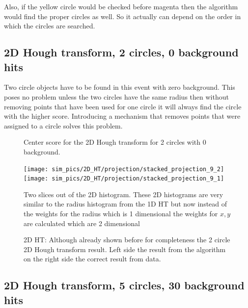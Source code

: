 \documentclass[11pt,twoside]{scrreprt}
\begin{document}
Also, if the yellow circle would be checked before magenta then the algorithm
would find the proper circles as well. So it actually can depend on the order
in which the circles are searched.

\subsection{2D Hough transform, 2 circles, 0 background hits} %
\label{sub:2d_hough_transform_2_circles_0_background}
Two circle objects have to be found in this event with zero background. This
poses no problem unless the two circles have the same radius then without
removing points that have been used for one circle it will always find the 
circle with the higher score. Introducing a mechanism that removes points
that were assigned to a circle solves this problem.

\begin{figure}[htp]
        \centering
        \caption{Center score for the 2D Hough transform for 2 circles with 0 background.}\label{fig:2d_ht_center}

        \texttt{[image: sim\_pics/2D\_HT/projection/stacked\_projection\_9\_2]}%
        \texttt{[image: sim\_pics/2D\_HT/projection/stacked\_projection\_9\_1]}
        \caption[Two slices out of the 2D histogram]{Two slices out of the 2D histogram. These 2D histograms are very similar to the radius histogram from the 1D HT
        but now instead of the weights for the radius which is 1 dimensional the weights for $x,y$ are calculated which are
        2 dimensional}

\caption[Results of 2D HT, 2 circles, 0 background]{2D HT: Although already shown before for completeness the 2 circle 2D Hough transform result. Left side the result from the algorithm on the right side the correct result from data.}
\end{figure}


\subsection{2D Hough transform, 5 circles, 30 background hits} %
\label{sub:2d_hough_transform_5_circles_30_background_hits}
\end{document}
